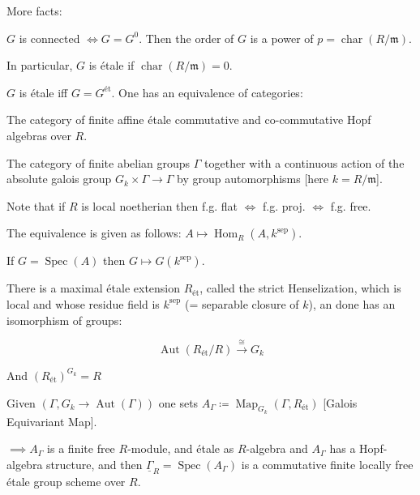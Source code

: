 \documentclass{article}
\theoremstyle{definition}
\numberwithin{theorem}{subsection}
\begin{document}
    More facts:

    \(G\) is connected \(\iff G = G^0\). Then the order of \(G\) is a power of \(p = \operatorname{char}(R / \mathfrak{m})\).

    In particular, \(G\) is \'etale if \(\operatorname{char}(R / \mathfrak{m}) = 0\).
    
    \(G\) is \'etale iff \(G = G^{\text{\'et}}\). One has an equivalence of categories:
    
    The category of finite affine \'etale commutative and co-commutative Hopf algebras over \(R\).

    The category of finite abelian groups \(\Gamma\) together with a continuous action of the absolute galois group \(G_k \times \Gamma \to \Gamma\) by group automorphisms [here \(k = R / \mathfrak{m}\)].

    Note that if \(R\) is local noetherian then f.g. flat \(\iff\) f.g. proj. \(\iff\) f.g. free.

    The equivalence is given as follows: \(A \mapsto \operatorname{Hom}_R(A,k^{\text{sep}})\).

    If \(G = \operatorname{Spec}(A)\) then \(G \mapsto G(k^{\text{sep}})\).

    There is a maximal \'etale extension \(R_{\text{\'et}}\), called the strict Henselization, which is local and whose residue field is \(k^{\text{sep}}\) (= separable closure of \(k\)), an done has an isomorphism of groups:

    \[
        \operatorname{Aut}(R_{\text{\'et}} / R) \xrightarrow{\cong} G_k
    \]

    And \((R_{\text{\'et}})^{G_k} = R\) 

    Given \((\Gamma, G_k \to \operatorname{Aut}(\Gamma))\) one sets \(A_\Gamma \coloneqq \operatorname{Map}_{G_k}(\Gamma , R_{\text{\'et}})\) [Galois Equivariant Map].

    \(\implies A_\Gamma\) is a finite free \(R\)-module, and \'etale as \(R\)-algebra and \(A_\Gamma\) has a Hopf-algebra structure, and then \(\underline{\Gamma }_R = \operatorname{Spec}(A_\Gamma)\) is a commutative finite locally free \'etale group scheme over \(R\).
\end{document}
